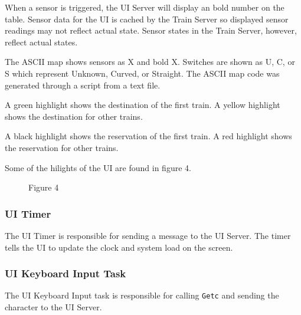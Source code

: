 \documentclass[letterpaper]{article}
\begin{document}
When a sensor is triggered, the UI Server will display an bold number on the table. Sensor data for the UI is cached by the Train Server so displayed sensor readings may not reflect actual state. Sensor states in the Train Server, however, reflect actual states.

The ASCII map shows sensors as X and bold X. Switches are shown as U, C, or S which represent Unknown, Curved, or Straight. The ASCII map code was generated through a script from a text file.

A green highlight shows the destination of the first train. A yellow highlight shows the destination for other trains.

A black highlight shows the reservation of the first train. A red highlight shows the reservation for other trains.

Some of the hilights of the UI are found in figure 4.
\begin{figure}
\noindent{}
\caption{Figure 4}
\end{figure}


\subsubsection{UI Timer%
  \label{ui-timer}%
}

The UI Timer is responsible for sending a message to the UI Server. The timer tells the UI to update the clock and system load on the screen.


\subsubsection{UI Keyboard Input Task%
  \label{ui-keyboard-input-task}%
}

The UI Keyboard Input task is responsible for calling \texttt{Getc} and sending the character to the UI Server.
\end{document}
